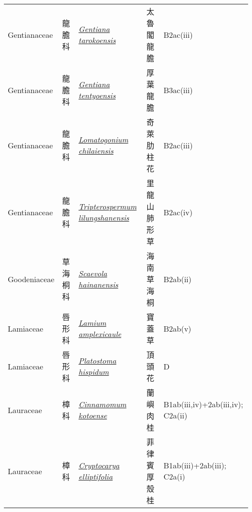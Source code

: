 {\begin{longtable}{p{2.5cm}p{2cm}p{5cm}p{2.5cm}p{3cm}}
    Gentianaceae & 龍膽科 & \href{http://www.theplantlist.org/tpl1.1/search?q=Gentiana+tarokoensis}{\textit{Gentiana tarokoensis} } & 太魯閣龍膽 & B2ac(iii) \index{Gentiana@\textit{Gentiana}!tarokoensis@\textit{tarokoensis}}  \index{太魯閣龍膽} \\
    Gentianaceae & 龍膽科 & \href{http://www.theplantlist.org/tpl1.1/search?q=Gentiana+tentyoensis}{\textit{Gentiana tentyoensis} } & 厚葉龍膽 & B3ac(iii) \index{Gentiana@\textit{Gentiana}!tentyoensis@\textit{tentyoensis}}  \index{厚葉龍膽} \\
    Gentianaceae & 龍膽科 & \href{http://www.theplantlist.org/tpl1.1/search?q=Lomatogonium+chilaiensis}{\textit{Lomatogonium chilaiensis} } & 奇萊肋柱花 & B2ac(iii) \index{Lomatogonium@\textit{Lomatogonium}!chilaiensis@\textit{chilaiensis}}  \index{奇萊肋柱花} \\
    Gentianaceae & 龍膽科 & \href{http://www.theplantlist.org/tpl1.1/search?q=Tripterospermum+lilungshanensis}{\textit{Tripterospermum lilungshanensis} } & 里龍山肺形草 & B2ac(iv) \index{Tripterospermum@\textit{Tripterospermum}!lilungshanensis@\textit{lilungshanensis}}  \index{里龍山肺形草} \\
    Goodeniaceae & 草海桐科 & \href{http://www.theplantlist.org/tpl1.1/search?q=Scaevola+hainanensis}{\textit{Scaevola hainanensis} } & 海南草海桐 & B2ab(ii) \index{Scaevola@\textit{Scaevola}!hainanensis@\textit{hainanensis}}  \index{海南草海桐} \\
    Lamiaceae & 唇形科 & \href{http://www.theplantlist.org/tpl1.1/search?q=Lamium+amplexicaule}{\textit{Lamium amplexicaule} } & 寶蓋草 & B2ab(v) \index{Lamium@\textit{Lamium}!amplexicaule@\textit{amplexicaule}}  \index{寶蓋草} \\
    Lamiaceae & 唇形科 & \href{http://www.theplantlist.org/tpl1.1/search?q=Platostoma+hispidum}{\textit{Platostoma hispidum} } & 頂頭花 & D \index{Platostoma@\textit{Platostoma}!hispidum@\textit{hispidum}}  \index{頂頭花} \\
    Lauraceae & 樟科 & \href{http://www.theplantlist.org/tpl1.1/search?q=Cinnamomum+kotoense}{\textit{Cinnamomum kotoense} } & 蘭嶼肉桂 & B1ab(iii,iv)+2ab(iii,iv); C2a(ii) \index{Cinnamomum@\textit{Cinnamomum}!kotoense@\textit{kotoense}}  \index{蘭嶼肉桂} \\
    Lauraceae & 樟科 & \href{http://www.theplantlist.org/tpl1.1/search?q=Cryptocarya+elliptifolia}{\textit{Cryptocarya elliptifolia} } & 菲律賓厚殼桂 & B1ab(iii)+2ab(iii); C2a(i) \index{Cryptocarya@\textit{Cryptocarya}!elliptifolia@\textit{elliptifolia}}  \index{菲律賓厚殼桂} \\

\end{longtable}}
